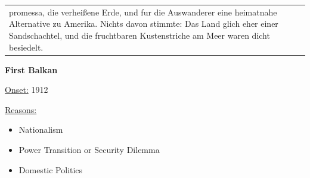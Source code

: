 {\begin{longtable}{p{}p{}}
promessa, die verheißene Erde, und fur die Auswanderer eine heimatnahe Alternative zu Amerika. Nichts davon stimmte: Das Land glich eher einer Sandschachtel, und die fruchtbaren Kustenstriche am Meer waren dicht besiedelt.
\\
\end{longtable}}
\clearpage
         \textbf{First Balkan} 

          \underline{Onset:} 1912         

\underline{Reasons:}
\begin{itemize}
\item Nationalism
\item Power Transition or Security Dilemma
\item Domestic Politics
\end{itemize}


